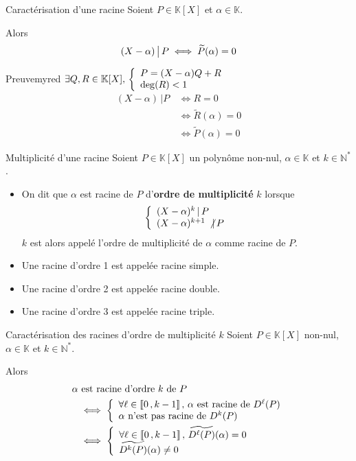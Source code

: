     \begin{theo}{Caractérisation d’une racine}{}
        Soient $P \in \mathbb{K}[X]$ et $\alpha \in \mathbb{K}$.
    
        Alors \[ (X-\alpha) \, \big| \, P \iff \widetilde{P}(\alpha) = 0 \] 
    \end{theo}
    
    \begin{demo}{Preuve}{myred}
        $\exists Q,R \in \mathbb{K}[X], \, \et{P = (X-\alpha)Q + R}{ \deg(R) < 1}$
        \begin{align*}
            (X-\alpha) \, | P \, & \iff R = 0 \\
            & \iff \tilde{R}(\alpha) = 0 \\
            & \iff \tilde{P}(\alpha) = 0
        \end{align*}
    \end{demo}

    \begin{defi}{Multiplicité d’une racine}{}
        Soient $P \in \mathbb{K}[X]$ un polynôme non-nul, $\alpha \in \mathbb{K}$ et $k \in \mathbb{N}^*$.
        \begin{itemize}
            \item On dit que $\alpha$ est racine de $P$ d’\textbf{ordre de multiplicité} $k$ lorsque \[ \et{(X-\alpha)^k \, | \, P}{(X - \alpha)^{k+1} \, \not| \, P} \] 
            $k$ est alors appelé l’ordre de multiplicité de $\alpha$ comme racine de $P$.
            \item Une racine d’ordre 1 est appelée racine simple.
            \item Une racine d’ordre 2 est appelée racine double.
            \item Une racine d’ordre 3 est appelée racine triple.
        \end{itemize}
    \end{defi}
    
    \begin{theo}{Caractérisation des racines d’ordre de multiplicité $k$}{}
        Soient $P \in \mathbb{K}[X]$ non-nul, $\alpha \in \mathbb{K}$ et $k \in \mathbb{N}^*$. 
    
        Alors \begin{align*}
            \alpha & \text{ est racine d’ordre } k \text{ de } P \\
            & \iff \et{\forall \ell \in \intervalleEntier{0}{k-1}, \, \alpha \text{ est racine de } D^{\ell}(P)}{\alpha \text{ n’est pas racine de } D^k(P)} \\
            & \iff \et{\forall \ell \in \intervalleEntier{0}{k-1}, \, \widetilde{D^{\ell}(P)}(\alpha) = 0}{\widetilde{D^k(P)}(\alpha) \neq 0}
            \end{align*}
    \end{theo}
    
